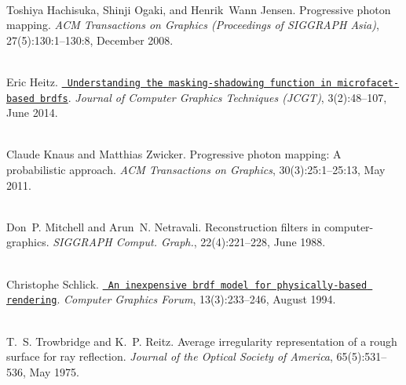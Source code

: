 \begin{DoxyDescription}
\item[\label{citelist_CITEREF_Hachisuka:2008:Progressive}%
\Hypertarget{citelist_CITEREF_Hachisuka:2008:Progressive}%
\mbox{[}7\mbox{]}]\hfill \\
Toshiya Hachisuka, Shinji Ogaki, and Henrik~Wann Jensen. Progressive photon mapping. {\itshape ACM Transactions on Graphics (Proceedings of SIGGRAPH Asia)}, 27(5)\+:130\+:1--130\+:8, December 2008. 


\item[\label{citelist_CITEREF_Heitz:2014:Microfacet}%
\Hypertarget{citelist_CITEREF_Heitz:2014:Microfacet}%
\mbox{[}8\mbox{]}]\hfill \\
Eric Heitz. \href{http://jcgt.org/published/0003/02/03/}{\texttt{ Understanding the masking-\/shadowing function in microfacet-\/based brdfs}}. {\itshape Journal of Computer Graphics Techniques (JCGT)}, 3(2)\+:48--107, June 2014.


\item[\label{citelist_CITEREF_Knaus:2011:Progressive}%
\Hypertarget{citelist_CITEREF_Knaus:2011:Progressive}%
\mbox{[}9\mbox{]}]\hfill \\
Claude Knaus and Matthias Zwicker. Progressive photon mapping\+: A probabilistic approach. {\itshape ACM Transactions on Graphics}, 30(3)\+:25\+:1--25\+:13, May 2011. 


\item[\label{citelist_CITEREF_Mitchell:1988:Reconstruction}%
\Hypertarget{citelist_CITEREF_Mitchell:1988:Reconstruction}%
\mbox{[}10\mbox{]}]\hfill \\
Don~P. Mitchell and Arun~N. Netravali. Reconstruction filters in computer-\/graphics. {\itshape SIGGRAPH Comput. Graph.}, 22(4)\+:221--228, June 1988. 


\item[\label{citelist_CITEREF_Schlick:1994:BRDF}%
\Hypertarget{citelist_CITEREF_Schlick:1994:BRDF}%
\mbox{[}11\mbox{]}]\hfill \\
Christophe Schlick. \href{https://onlinelibrary.wiley.com/doi/abs/10.1111/1467-8659.1330233}{\texttt{ An inexpensive brdf model for physically-\/based rendering}}. {\itshape Computer Graphics Forum}, 13(3)\+:233--246, August 1994. 


\item[\label{citelist_CITEREF_Trowbridge:1975:Average}%
\Hypertarget{citelist_CITEREF_Trowbridge:1975:Average}%
\mbox{[}12\mbox{]}]\hfill \\
T.~S. Trowbridge and K.~P. Reitz. Average irregularity representation of a rough surface for ray reflection. {\itshape Journal of the Optical Society of America}, 65(5)\+:531--536, May 1975. 



\end{DoxyDescription}
